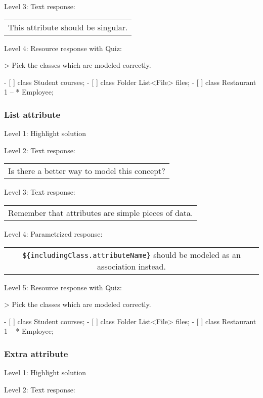 \noindent Level 3: Text response: \medskip

\begin{tabular}{|c}
This attribute should be singular.
\end{tabular} \medskip

\noindent Level 4: Resource response with Quiz:

> Pick the classes which are modeled correctly.

- [ ] class Student { courses; }
- [ ] class Folder { List<File> files; }
- [ ] class Restaurant { 1 -- * Employee; }


\subsubsection{List attribute}

\noindent Level 1: Highlight solution \medskip

\noindent Level 2: Text response: \medskip

\begin{tabular}{|c}
Is there a better way to model this concept?
\end{tabular} \medskip

\noindent Level 3: Text response: \medskip

\begin{tabular}{|c}
Remember that attributes are simple pieces of data.
\end{tabular} \medskip

\noindent Level 4: Parametrized response: \medskip

\begin{tabular}{|c}
\verb|${includingClass.attributeName}| should be modeled as an association instead.
\end{tabular} \medskip

\noindent Level 5: Resource response with Quiz:

> Pick the classes which are modeled correctly.

- [ ] class Student { courses; }
- [ ] class Folder { List<File> files; }
- [ ] class Restaurant { 1 -- * Employee; }


\subsubsection{Extra attribute}

\noindent Level 1: Highlight solution \medskip

\noindent Level 2: Text response: \medskip

